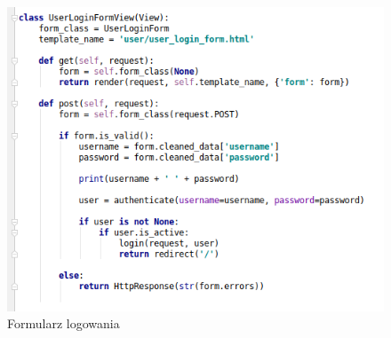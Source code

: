 \documentclass[12pt]{article}
\begin{document}
\begin{figure}[H]
	\centering
	\includegraphics[scale=0.7]{img/c_user_login.png}
	\caption{Formularz logowania}
\end{figure}
\end{document}
